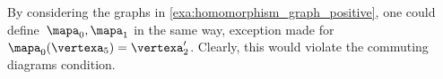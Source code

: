 \begin{example}[Counterexample]
    By considering the graphs in \cref{exa:homomorphism_graph_positive}, one could define~$\mapa_0,\mapa_1$ in the same way, exception made for~$\mapa_0(\vertexa_5)=\vertexa_2'$.
    Clearly, this would violate the commuting diagrams condition.
\end{example}


\publictodomessage
{}

